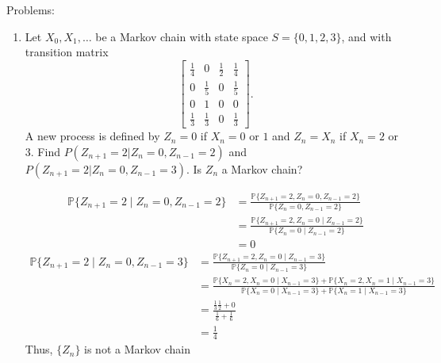 \documentclass[10pt, oneside]{article}
\newcommand{\bbP}{\mathbb{P}}
\theoremstyle{definition}
\begin{document}
Problems:
\begin{enumerate}
    \item Let $X_0, X_1, \dots$ be a Markov chain with state space $S = \{0, 1, 2, 3\}$, and with transition matrix
    \[
    \begin{bmatrix}
        \frac{1}{4} & 0 & \frac{1}{2} & \frac{1}{4} \\
        0 &  \frac{1}{5} & 0 & \frac{1}{5} \\
        0 & 1 & 0 & 0 \\
        \frac{1}{3} & \frac{1}{3} & 0 & \frac{1}{3}
    \end{bmatrix}.
    \]
    A new process is defined by $Z_n = 0$ if $X_n = 0$ or $1$ and $Z_n = X_n$ if $X_n = 2$ or $3$. Find $P(Z_{n+1} = 2 | Z_n = 0, Z_{n-1} = 2)$ and $P(Z_{n+1} = 2 | Z_n = 0, Z_{n-1} = 3)$. Is $Z_n$ a Markov chain?
    \begin{solution}
    \begin{align*}
        \bbP\{Z_{n + 1}= 2 \mid Z_n = 0, Z_{n-1} = 2\} &= \frac{\bbP\{Z_{n + 1} = 2, Z_{n} = 0, Z_{n-1} = 2\}}{\bbP\{Z_n = 0, Z_{n-1 } = 2\}}\\
        &= \frac{\bbP\{Z_{n + 1} = 2, Z_{n} = 0 \mid Z_{n-1} =2\}}{\bbP\{Z_n = 0 \mid Z_{n-1} = 2\}}\\
        &= 0
    \end{align*}
    \begin{align*}
        \bbP\{Z_{n + 1} = 2 \mid Z_n = 0, Z_{n-1} = 3\} &= \frac{\bbP\{Z_{n + 1} = 2, Z_{n} = 0 \mid Z_{n-1} =3\}}{\bbP\{Z_n = 0 \mid Z_{n-1} = 3\}}\\
        &= \frac{\bbP\{X_n = 2, X_n = 0 \mid X_{n-1} = 3\} +\bbP\{X_n = 2, X_n = 1 \mid X_{n-1} = 3\}}{\bbP\{X_n = 0 \mid X_{n-1} =3\} + \bbP\{X_{n} = 1 \mid X_{n-1} = 3\}}\\
        &= \frac{\frac{1}{3}\frac{1}{2} + 0}{\frac{1}{6} + \frac{1}{6}}\\
        &= \frac{1}{4}
    \end{align*}
    Thus, $\{Z_n\}$ is not a Markov chain
    \end{solution}


\end{enumerate}
\end{document}
